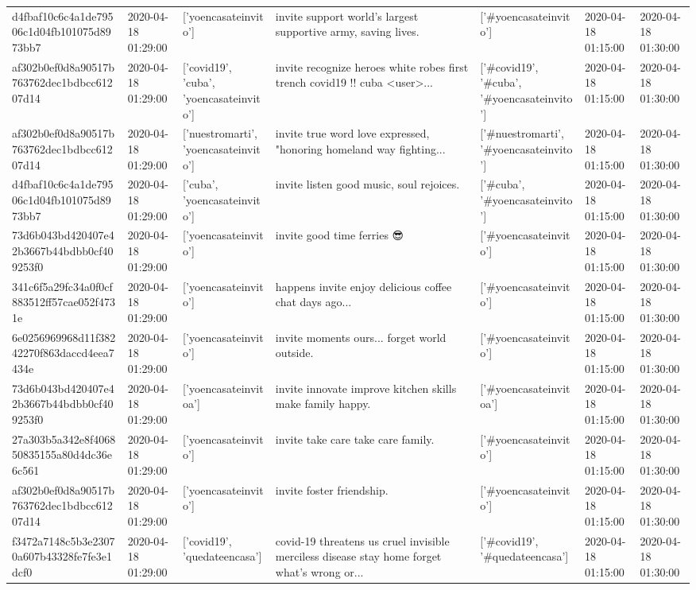 \begin{tabular}{lllllll}
d4fbaf10c6c4a1de79506c1d04fb101075d8973bb7 & 2020-04-18 01:29:00 & ['yoencasateinvito'] & invite support world's largest supportive army, saving lives. & ['#yoencasateinvito'] & 2020-04-18 01:15:00 & 2020-04-18 01:30:00 \\
af302b0ef0d8a90517b763762dec1bdbcc61207d14 & 2020-04-18 01:29:00 & ['covid19', 'cuba', 'yoencasateinvito'] & invite recognize heroes white robes first trench covid19 !!️ cuba <user>... & ['#covid19', '#cuba', '#yoencasateinvito'] & 2020-04-18 01:15:00 & 2020-04-18 01:30:00 \\
af302b0ef0d8a90517b763762dec1bdbcc61207d14 & 2020-04-18 01:29:00 & ['nuestromarti', 'yoencasateinvito'] & invite true word love expressed, "honoring homeland way fighting... & ['#nuestromarti', '#yoencasateinvito'] & 2020-04-18 01:15:00 & 2020-04-18 01:30:00 \\
d4fbaf10c6c4a1de79506c1d04fb101075d8973bb7 & 2020-04-18 01:29:00 & ['cuba', 'yoencasateinvito'] & invite listen good music, soul rejoices. & ['#cuba', '#yoencasateinvito'] & 2020-04-18 01:15:00 & 2020-04-18 01:30:00 \\
73d6b043bd420407e42b3667b44bdbb0cf409253f0 & 2020-04-18 01:29:00 & ['yoencasateinvito'] & invite good time ferries 😎 & ['#yoencasateinvito'] & 2020-04-18 01:15:00 & 2020-04-18 01:30:00 \\
341c6f5a29fc34a0f0cf883512ff57cae052f4731e & 2020-04-18 01:29:00 & ['yoencasateinvito'] & happens invite enjoy delicious coffee chat days ago... & ['#yoencasateinvito'] & 2020-04-18 01:15:00 & 2020-04-18 01:30:00 \\
6e0256969968d11f38242270f863daccd4eea7434e & 2020-04-18 01:29:00 & ['yoencasateinvito'] & invite moments ours... forget world outside. & ['#yoencasateinvito'] & 2020-04-18 01:15:00 & 2020-04-18 01:30:00 \\
73d6b043bd420407e42b3667b44bdbb0cf409253f0 & 2020-04-18 01:29:00 & ['yoencasateinvitoa'] & invite innovate improve kitchen skills make family happy. & ['#yoencasateinvitoa'] & 2020-04-18 01:15:00 & 2020-04-18 01:30:00 \\
27a303b5a342e8f406850835155a80d4dc36e6c561 & 2020-04-18 01:29:00 & ['yoencasateinvito'] & invite take care take care family. & ['#yoencasateinvito'] & 2020-04-18 01:15:00 & 2020-04-18 01:30:00 \\
af302b0ef0d8a90517b763762dec1bdbcc61207d14 & 2020-04-18 01:29:00 & ['yoencasateinvito'] & invite foster friendship. & ['#yoencasateinvito'] & 2020-04-18 01:15:00 & 2020-04-18 01:30:00 \\
f3472a7148c5b3e23070a607b43328fe7fe3e1dcf0 & 2020-04-18 01:29:00 & ['covid19', 'quedateencasa'] & covid-19 threatens us cruel invisible merciless disease stay home forget what's wrong or... & ['#covid19', '#quedateencasa'] & 2020-04-18 01:15:00 & 2020-04-18 01:30:00 \\

\end{tabular}
